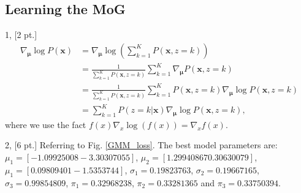 \documentclass[12pt,letterpaper]{article}
\begin{document}
\subsection{Learning the MoG}

1, [2 pt.]
\begin{align}
\nabla_{\bm{\mu}} \log P(\mathbf{x}) & = \nabla_{\bm{\mu}} \log \left( \sum_{k=1}^{K} P(\mathbf{x}, z=k) \right) \nonumber \\
& = \frac{1}{\sum_{k=1}^{K} P(\mathbf{x}, z=k)} \sum_{k=1}^{K} \nabla_{\bm{\mu}} P(\mathbf{x}, z=k) \nonumber \\
& = \frac{1}{\sum_{k=1}^{K} P(\mathbf{x}, z=k)} \sum_{k=1}^{K} P(\mathbf{x}, z=k) \nabla_{\bm{\mu}} \log P(\mathbf{x}, z=k) \nonumber \\
& = \sum_{k=1}^{K} P(z=k | \mathbf{x}) \nabla_{\bm{\mu}} \log P(\mathbf{x}, z=k),
\label{GMM_posterior}
\end{align}
where we use the fact $f(x) \nabla_x \log (f(x)) = \nabla_x f(x)$.

2, [6 pt.] Referring to Fig. \ref{GMM_loss}. The best model parameters are: $\mu_1 = [-1.09925008 -3.30307055]$, $\mu_2 = [1.29940867  0.30630079]$, $\mu_1 = [0.09809401 -1.5353744]$, $\sigma_1 = 0.19823763$, $\sigma_2 = 0.19667165$, $\sigma_3 = 0.99854809$, $\pi_1 = 0.32968238$, $\pi_2 = 0.33281365$ and $\pi_3 = 0.33750394$.
\end{document}
